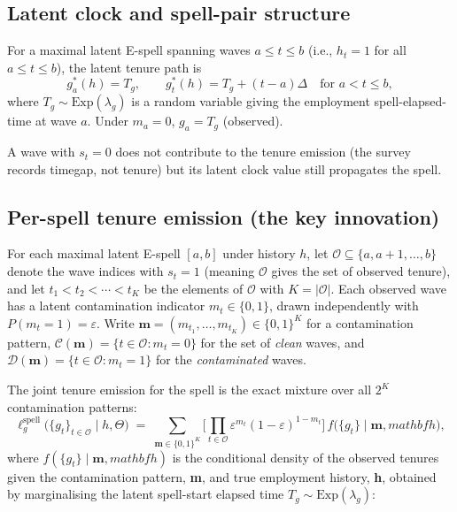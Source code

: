 \documentclass[12pt]{article}
\begin{document}
\subsection{Latent clock and spell-pair structure}
\label{sec:spell_pair}

For a maximal latent E-spell spanning waves \(a \le t \le b\) (i.e.,
\(h_t = 1\) for all \(a \le t \le b\)), the latent tenure path is
\begin{equation}
g^*_a(h) = T_g, \qquad
g^*_t(h) = T_g + (t-a)\Delta \quad\text{for } a < t \le b,
\label{eq:deterministic_clocks_eps}
\end{equation}
where \(T_g \sim \mathrm{Exp}(\lambda_g)\) is a random variable giving the employment
spell-elapsed-time at wave \(a\). Under \(m_{a} = 0\), \(g_{a} = T_g\)
(observed).

A wave with \(s_{t}=0\) does not
contribute to the tenure emission (the survey records timegap, not tenure)
but its latent clock value still propagates the spell.

\subsection{Per-spell tenure emission (the key innovation)}
\label{sec:per_spell}

For each maximal latent E-spell \([a,b]\) under history \(h\), let
\(\mathcal{O} \subseteq \{a,a+1,\dots,b\}\) denote the wave indices with
\(s_{t} = 1\) (meaning \(\mathcal{O}\) gives the set of observed tenure), 
and let \(t_1 < t_2 < \cdots < t_K\) be
the elements of \(\mathcal{O}\) with \(K = |\mathcal{O}|\). Each observed
wave has a latent contamination indicator \(m_t \in \{0,1\}\), drawn
independently with \(P(m_t = 1) = \varepsilon\). Write
\(\mathbf{m} = (m_{t_1}, \dots, m_{t_K}) \in \{0,1\}^K\) for a
contamination pattern, \(\mathcal{C}(\mathbf{m}) = \{t \in \mathcal{O} :
m_t = 0\}\) for the set of \textit{clean} waves, and
\(\mathcal{D}(\mathbf{m}) = \{t \in \mathcal{O} : m_t = 1\}\) for the
\textit{contaminated} waves.

The joint tenure emission for the spell is the exact mixture over all
\(2^K\) contamination patterns:
\begin{equation}
\ell^{\mathrm{spell}}_g\!\big(\{g_t\}_{t \in \mathcal{O}} \mid h, \Theta\big)
\;=\;
\sum_{\mathbf{m} \in \{0,1\}^K}
\biggl[\prod_{t \in \mathcal{O}} \varepsilon^{m_t}(1-\varepsilon)^{1-m_t}\biggr]\,
f\!\big(\{g_t\} \mid \mathbf{m}, mathbf{h}\big),
\label{eq:spell_emission}
\end{equation}
where \(f(\{g_t\} \mid \mathbf{m}, mathbf{h})\) is the conditional density of the
observed tenures given the contamination pattern, \textbf{m}, and true employment history, 
\textbf{h}, obtained by
marginalising the latent spell-start elapsed time
\(T_g \sim \mathrm{Exp}(\lambda_g)\):
\end{document}
